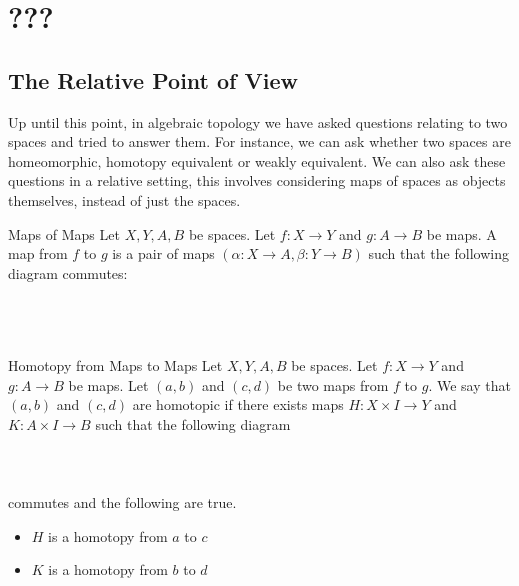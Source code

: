 \documentclass[a4paper]{article}
\begin{document}
\pagebreak
\section{???}

\subsection{The Relative Point of View}
Up until this point, in algebraic topology we have asked questions relating to two spaces and tried to answer them. For instance, we can ask whether two spaces are homeomorphic, homotopy equivalent or weakly equivalent. We can also ask these questions in a relative setting, this involves considering maps of spaces as objects themselves, instead of just the spaces. 

\begin{defn}{Maps of Maps}{} Let $X,Y,A,B$ be spaces. Let $f:X\to Y$ and $g:A\to B$ be maps. A map from $f$ to $g$ is a pair of maps $(\alpha:X\to A,\beta:Y\to B)$ such that the following diagram commutes: \\~\\
\\~\\
\end{defn}

\begin{defn}{Homotopy from Maps to Maps}{} Let $X,Y,A,B$ be spaces. Let $f:X\to Y$ and $g:A\to B$ be maps. Let $(a,b)$ and $(c,d)$ be two maps from $f$ to $g$. We say that $(a,b)$ and $(c,d)$ are homotopic if there exists maps $H:X\times I\to Y$ and $K:A\times I\to B$ such that the following diagram \\~\\
\\~\\
commutes and the following are true. 
\begin{itemize}
\item $H$ is a homotopy from $a$ to $c$
\item $K$ is a homotopy from $b$ to $d$
\end{itemize}
\end{defn}
\end{document}
